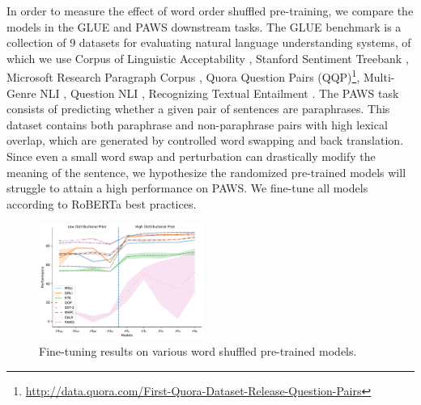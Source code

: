 \documentclass[12pt]{article}
\begin{document}
In order to measure the effect of word order shuffled pre-training, we compare the models in the GLUE and PAWS downstream tasks. The GLUE \cite{wang2018glue} benchmark is a collection of 9 datasets for evaluating natural language understanding systems, of which we use Corpus of Linguistic Acceptability \cite[CoLA,][]{cola_warstadt2019neural}, Stanford Sentiment Treebank \cite[SST,][]{sst2_socher2013recursive}, Microsoft Research Paragraph Corpus \cite[MRPC,][]{mrpc_dolan2005automatically}, Quora Question Pairs (QQP)\footnote{\href{http://data.quora.com/First-Quora-Dataset-Release-Question-Pairs}{http://data.quora.com/First-Quora-Dataset-Release-Question-Pairs}}, Multi-Genre NLI \cite[MNLI,][]{williams-etal-2018-broad}, Question NLI \cite[QNLI,][]{qnli_rajpurkar2016squad, qnli_2_demszky2018transforming}, Recognizing Textual Entailment \cite[RTE,][]{rte1_dagan2005pascal, rte2_haim2006second, rte3_giampiccolo2007third, rte5_bentivogli2009fifth}. The PAWS task \cite{zhang2019paws} consists of predicting whether a given pair of sentences are paraphrases. This dataset contains both paraphrase and non-paraphrase pairs with high lexical overlap, which are generated by controlled word swapping and back translation. Since even a small word swap and perturbation can drastically modify the meaning of the sentence, we hypothesize the randomized pre-trained models will struggle to attain a high performance on PAWS. We fine-tune all models according to RoBERTa best practices.

\begin{figure}
\begin{center}
  \includegraphics[width=0.48\textwidth]{images/masked_result.pdf}
\end{center}
\caption{Fine-tuning results on various word shuffled pre-trained models.}
\label{fig:masked_results}
\end{figure}
\end{document}
